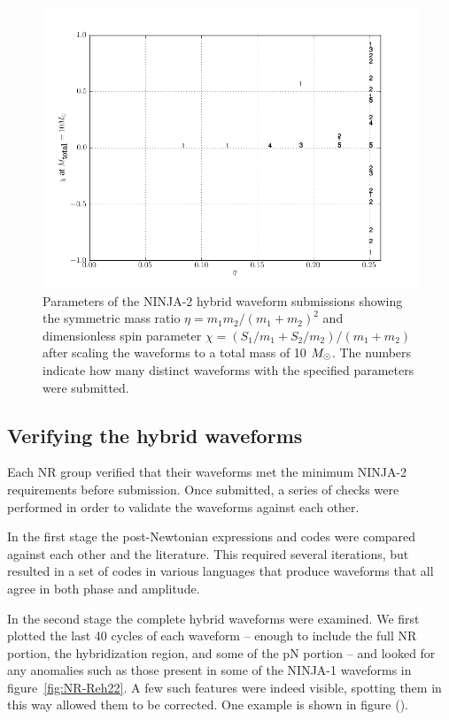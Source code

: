 \begin{figure}
  \includegraphics[width=\linewidth]{figures/ninja2/ninja2_cat.png}
  \caption[Parameters of the NINJA-2 submissions]{
  \label{f:ninja2_param_map}
Parameters of the NINJA-2 hybrid waveform submissions showing the
symmetric mass ratio $\eta=m_1 m_2 /(m_1+m_2)^2$ and dimensionless
spin parameter $\chi=(S_1/m_1 + S_2/m_2)/(m_1+m_2)$ after scaling the
waveforms to a total mass of 10 $M_\odot$.  The numbers indicate how
many distinct waveforms with the specified parameters were submitted.}
\end{figure}%

\subsection{Verifying the hybrid waveforms}

Each NR group verified that their waveforms met the minimum NINJA-2
requirements before submission.  Once submitted, a series of checks
were performed in order to validate the waveforms against each other.

In the first stage the post-Newtonian expressions and codes were
compared against each other and the literature.  This required several
iterations, but resulted in a set of codes in various languages that
produce waveforms that all agree in both phase and amplitude. 

In the second stage the complete hybrid waveforms were examined.
We first plotted the last 40 cycles of each waveform -- enough to
include the full NR portion, the hybridization region, and some of the
pN portion -- and looked for any anomalies such as those present in
some of the NINJA-1 waveforms in figure~\ref{fig:NR-Reh22}.  A few such
features were indeed visible, spotting them in this way allowed them
to be corrected.  One example is shown in figure ().

